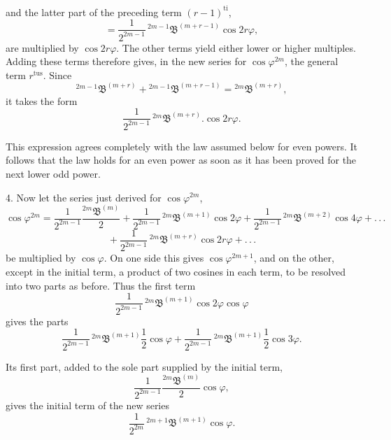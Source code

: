 and the latter part of the preceding term $(r-1)^{\text{ti}}$,
\[
= \frac{1}{2^{2m-1}}\,{}^{2m-1}\mathfrak{B}^{(m+r-1)}\cos 2r\varphi,
\]
are multiplied by $\cos 2r\varphi$. The other terms yield either lower or higher multiples. Adding these terms therefore gives, in the new series for $\cos\varphi^{2m}$, the general term $r^{\text{tus}}$. Since
\[
{}^{2m-1}\mathfrak{B}^{(m+r)} + {}^{2m-1}\mathfrak{B}^{(m+r-1)} = {}^{2m}\mathfrak{B}^{(m+r)},
\]
it takes the form
\[
\frac{1}{2^{2m-1}}\,{}^{2m}\mathfrak{B}^{(m+r)} . \cos 2r\varphi.
\]

\par\noindent This expression agrees completely with the law assumed below for even powers. It follows that the law holds for an even power as soon as it has been proved for the next lower odd power.

4. Now let the series just derived for $\cos\varphi^{2m}$,
\[
\cos\varphi^{2m} = \frac{1}{2^{2m-1}}\frac{{}^{2m}\mathfrak{B}^{(m)}}{2}
+ \frac{1}{2^{2m-1}}\,{}^{2m}\mathfrak{B}^{(m+1)}\cos 2\varphi
+ \frac{1}{2^{2m-1}}\,{}^{2m}\mathfrak{B}^{(m+2)}\cos 4\varphi + .\,.\,.
\]
\[
{} + \frac{1}{2^{2m-1}}\,{}^{2m}\mathfrak{B}^{(m+r)}\cos 2r\varphi + .\,.\,.
\]
be multiplied by $\cos\varphi$. On one side this gives $\cos\varphi^{2m+1}$, and on the other, except in the initial term, a product of two cosines in each term, to be resolved into two parts as before. Thus the first term
\[
\frac{1}{2^{2m-1}}\,{}^{2m}\mathfrak{B}^{(m+1)}\cos 2\varphi\cos\varphi
\]
gives the parts
\[
\frac{1}{2^{2m-1}}\,{}^{2m}\mathfrak{B}^{(m+1)}\frac{1}{2}\cos\varphi
+ \frac{1}{2^{2m-1}}\,{}^{2m}\mathfrak{B}^{(m+1)}\frac{1}{2}\cos 3\varphi.
\]

\par\noindent Its first part, added to the sole part supplied by the initial term,
\[
\frac{1}{2^{2m-1}}\frac{{}^{2m}\mathfrak{B}^{(m)}}{2}\cos\varphi,
\]
gives the initial term of the new series
\[
\frac{1}{2^{2m}}\,{}^{2m+1}\mathfrak{B}^{(m+1)}\cos\varphi.
\]
